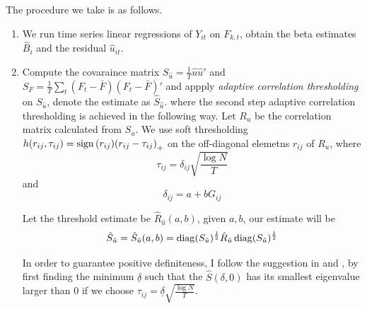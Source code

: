 The procedure we take is as follows. 
\begin{enumerate}
    \item We run time series linear regressions of \(Y_{it}\) on \(F_{k,t}\), obtain the beta estimates \(\hat{B}_{i}\) and the residual \(\hat{u}_{it}\). 
    \item Compute the covaraince matrix \(S_{\hat{u}} = \frac{1}{T}\hat{u}\hat{u}'\) and \(S_{F} = \frac{1}{T} \sum_{t} (F_{t} - \bar{F})(F_{t} - \bar{F})'\) and appply \textit{adaptive correlation thresholding} on \(S_{\hat{u}}\), denote the estimate as \(\hat{S}_{\hat{u}}\). 
where the second step adaptive correlation thresholding is achieved in the following way. Let \(R_{u}\) be the correlation matrix calculated from \(S_{u}\). We use soft thresholding \(h(r_{ij}, \tau_{ij}) = \sign\pqty{r_{ij}} \pqty{r_{ij} - \tau_{ij}}_{+}\) on the off-diagonal elemetns \(r_{ij}\) of \(R_{u}\), where 
\begin{equation*}
    \tau_{ij} = \delta_{ij} \sqrt{\frac{\log N}{T}}
\end{equation*}
and 
\begin{equation*}
    \delta_{ij} = a + b G_{ij}
\end{equation*}


Let the threshold estimate be \(\hat{R}_{\hat{u}}(a,b)\), given \(a,b\), our estimate will be
\begin{equation*}
    \hat{S}_{\hat{u}} = \hat{S}_{\hat{u}}(a,b) = \operatorname{diag}(S_{\hat{u}})^{\frac{1}{2}} \hat{R}_{\hat{u}}\operatorname{diag}(S_{\hat{u}})^{\frac{1}{2}}
\end{equation*}

In order to guarantee positive definiteness, I follow the suggestion in \cite{fan2015OverviewEstimation} and \cite{fan2013LargeCovariance}, by first finding the minimum \(\underline{\delta}\) such that the \(\hat{S}(\delta, 0)\) has its smallest eigenvalue larger than \(0\) if we choose \(\tau_{ij} = \underline{\delta} \sqrt{\frac{\log N}{T}}\). 


\end{enumerate}

